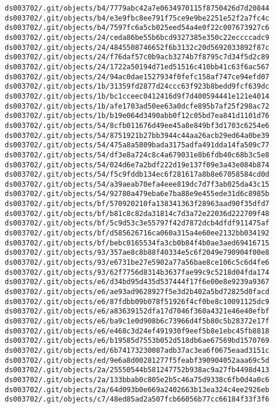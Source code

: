 \documentclass[11pt]{article}
\begin{document}
\begin{Verbatim}[commandchars=\\\{\}]
ds003702/.git/objects/b4/7779abc42a7e0634970115f8750426d7d20844
ds003702/.git/objects/b4/e3e9fbc8ee791f75ce9e9be2251e52f2a7fc4c
ds003702/.git/objects/b4/7597fc6a5cb025eed54a4e0f22c007673927c6
ds003702/.git/objects/24/ceda86be55b6bcd9327385e350c22eccccadc9
ds003702/.git/objects/24/4845508746652f6b3132c20d5692033892f87c
ds003702/.git/objects/24/f76daf57c0b9acb3274b7f8795c7d34f5d2c89
ds003702/.git/objects/24/1722a50194d71ed51516c410bb41c63f6ac567
ds003702/.git/objects/24/94ac0dae1527934f0fefc158af747ce94efd07
ds003702/.git/objects/1b/31359fd2877d24ccc63f923b8bedd9fcf639dc
ds003702/.git/objects/1b/bc1cceec0412416d9f7d400594441e121e4014
ds003702/.git/objects/1b/afe1703ad50ee63a0dcfe895b7af25f298ac72
ds003702/.git/objects/1b/b19e064d3490abb0f12c05bd7ea841d1101d76
ds003702/.git/objects/54/8cfb011676d49ee45a8e849bf3d1703c6254e6
ds003702/.git/objects/54/8751921b27bb3944c44aa26acb29ed64a0be39
ds003702/.git/objects/54/475a8a5809bada3175adfa491dda14fa509c77
ds003702/.git/objects/54/df3e8a724c8c4a679031e8b6fdb40c68b3c5e8
ds003702/.git/objects/54/024d6e7a2bdf222d19e137f09e3a43e084b874
ds003702/.git/objects/54/f5c9fddb134ec6f281617a8b8e67058584cd0d
ds003702/.git/objects/54/a39aeab70efa4eee819dc7d7f3ab025da43c15
ds003702/.git/objects/54/92780a479eba6e7ba88e9e455ede31d6c8985b
ds003702/.git/objects/bf/570920210fa138341363f28963aad90f35dfd7
ds003702/.git/objects/bf/b81c8c82da31814c7d3a72e22036d222709f48
ds003702/.git/objects/bf/5c9d53c3e55797f42d7872dcb4dfdf911475af
ds003702/.git/objects/bf/d585626716ca060a315a4e60ee2132bb034192
ds003702/.git/objects/bf/bebc0165534fa3cb0b84f4b0ae3aed69416715
ds003702/.git/objects/93/357ae8c8b88f40334e5c6f2049e790904f00e8
ds003702/.git/objects/93/e6731be27e5902a77a56bae8ce106c5c6d4fe6
ds003702/.git/objects/93/62f7756d8314b3637fae99c9c5218d04fda174
ds003702/.git/objects/e6/d34bd95d435d537444f17f6e00e8e9239a9367
ds003702/.git/objects/e6/ae93ad9628927f5e3d2b402a5bd72825d0facd
ds003702/.git/objects/e6/87fdbb09b078f51926f4cf0be8c10091125dc9
ds003702/.git/objects/e6/a83639152dfa17d7046f360a4321e46e40efbf
ds003702/.git/objects/e6/ba9c1e0d908b6c73966d4f5b80c5b28372e17f
ds003702/.git/objects/e6/e468c3d24ef491930f9eef5b8e1ebc45fb8818
ds003702/.git/objects/e6/b19585d7553b052d518db6ae67569bd1570769
ds003702/.git/objects/ed/6b74173230087adb37ac3ea6f0675eaad3151c
ds003702/.git/objects/ed/9e6a8d00281277f5feabf390904052aaa69c5d
ds003702/.git/objects/2a/25550544b581247752b938ac9a27fb4498d413
ds003702/.git/objects/2a/133bbab0c805e2b5c46a75d9338c6fb0d4a0c6
ds003702/.git/objects/2a/64d093b0e669a2402663b13ea324c4ee2926eb
ds003702/.git/objects/c7/48ed85ad2a507fcb66056b77cc66184f33f3f6

\end{Verbatim}
\end{document}
